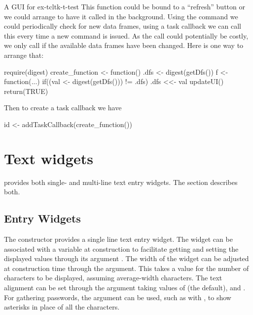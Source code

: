 \begin{example}{A GUI for }{ex-tcltk-t-test}
This function could be bound to a ``refresh'' button or we could
arrange to have it called in the background. Using the 
command we could periodically check for new data frames, using a task
callback we can call this every time a new command is issued.  As the
call could potentially be costly, we only call if the available data
frames have been changed. Here is one way to arrange that:
\begin{Schunk}
\begin{Sinput}
 require(digest)
 create_function <- function() {
   .dfs <- digest(getDfs())
   f <- function(...) {
     if((val <- digest(getDfs())) != .dfs) {
       .dfs <<- val
       updateUI()
     }
     return(TRUE)
   }
 }
\end{Sinput}
\end{Schunk}
Then to create a task callback we have
\begin{Schunk}
\begin{Sinput}
 id <- addTaskCallback(create_function())
\end{Sinput}
\end{Schunk}

\end{example}


\section{Text widgets}
\label{sec:tcltk:text-widgets}
\Tk\/ provides both single- and multi-line text entry widgets. The
section describes both.

\subsection{Entry Widgets}
\label{sec:tcltk:entry-widgets}

The  constructor provides a single line text
entry widget. The widget can be associated with a \TCL\/ variable at
construction to facilitate getting and setting the displayed values
through its argument . The width of
the widget can be adjusted at construction time through the
 argument. This takes a value for the number
of characters to be displayed, assuming average-width characters.  The
text alignment can be set through the 
argument taking values of  (the default), 
and . For gathering passwords, the argument
 can be used, such as with
\qcode{*}, to show asterisks in place of all the
characters.

